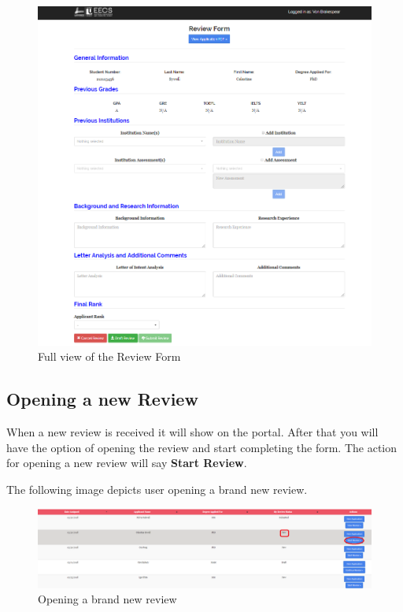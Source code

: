 \documentclass[fontsize=12pt,paper=letter,twoside]{scrartcl}
\begin{document}
\begin{figure}[!htb]
\begin{center}
\includegraphics[width=.99\textwidth]{images/review_form.png}
\end{center}
\caption{Full view of the Review Form}
\label{fig:review_form}
\end{figure}

\clearpage
\newpage
\subsection{Opening a new Review}
When a new review is received it will show on the portal. After that you will have the option of opening the review and start completing the form. The action for opening a new review will say \textbf{Start Review}.

\bigskip
\noindent The following image depicts user opening a brand new review.

\begin{figure}[!htb]
\begin{center}
\includegraphics[width=.99\textwidth]{images/opening_new_review.png}
\end{center}
\caption{Opening a brand new review}
\label{fig:opening_new_review}
\end{figure}
\end{document}
